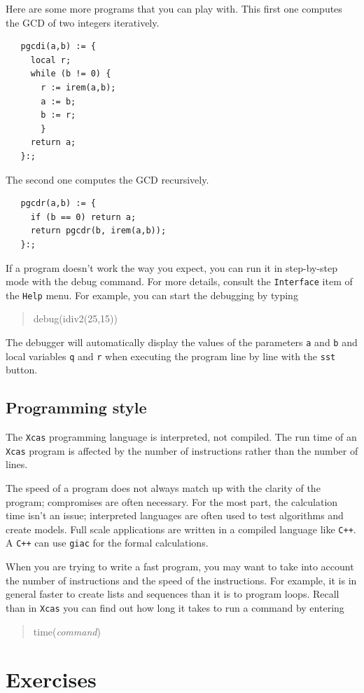 \documentclass{article}
\newcommand{\xcasin}[1]
{\begin{quote}\ttfamily
#1
\end{quote}}
\begin{document}
Here are some more programs that you can play with.  This first one
computes the GCD of two integers iteratively.
\begin{verbatim}
   pgcdi(a,b) := {
     local r;
     while (b != 0) {
       r := irem(a,b);
       a := b;
       b := r;
       }
     return a;
   }:;
\end{verbatim}
The second one computes the GCD recursively.
\begin{verbatim}
   pgcdr(a,b) := {
     if (b == 0) return a;
     return pgcdr(b, irem(a,b));
   }:;
\end{verbatim}

If a program doesn't work the way you expect, you can run it in
step-by-step mode with the debug command.  For more details, consult
the \texttt{Interface} item of the \texttt{Help} menu.  For example,
you can start the debugging by typing
\xcasin{debug(idiv2(25,15))}
The debugger will automatically display the values of the parameters
\texttt{a} and \texttt{b} and local variables \texttt{q} and
\texttt{r} when executing the program line by line with the
\texttt{sst} button.

\subsection{Programming style}

The \texttt{Xcas} programming language is interpreted, not compiled.
The run time of an \texttt{Xcas} program is affected by the number of
instructions rather than the number of lines.  

The speed of a program does not always match up with the clarity of
the program; compromises are often necessary.  For the most part, the
calculation time isn't an issue; interpreted languages are often used
to test algorithms and create models.   Full scale applications are
written in a compiled language like \texttt{C++}.  A \texttt{C++} can
use \texttt{giac} for the formal calculations.

When you are trying to write a fast program, you may want to take into
account the number of instructions and the speed of the instructions.
For example, it is in general faster to create lists and sequences
than it is to program loops.  Recall than in \texttt{Xcas} you can
find out how long it takes to run a command by entering
\xcasin{time(\textit{command})}

\section{Exercises}
\end{document}
